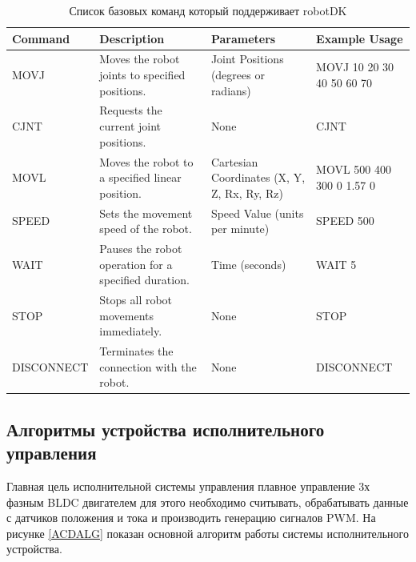 \begin{table}[H]
	\caption{Список базовых команд который поддерживает robotDK}\label{TRobotDK}
	\begin{adjustbox}{width=\textwidth}

		\begin{tabular}{|l|l|l|l|}
			\hline
			Command    & Description                                             & Parameters                                     & Example 			Usage             \\ \hline
			MOVJ       & Moves 			the robot joints to specified positions.       & Joint 			Positions (degrees or radians)        & MOVJ 			10 20 30 40 50 60 70 \\ \hline
			CJNT       & Requests 			the current joint positions.                & None                                           & CJNT                         \\ \hline
			MOVL       & Moves 			the robot to a specified linear position.      & Cartesian 			Coordinates (X, Y, Z, Rx, Ry, Rz) & MOVL 			500 400 300 0 1.57 0 \\ \hline
			SPEED      & Sets 			the movement speed of the robot.                & Speed 			Value (units per minute)              & SPEED 			500                 \\ \hline
			WAIT       & Pauses 			the robot operation for a specified duration. & Time 			(seconds)                              & WAIT 			5                    \\ \hline
			STOP       & Stops 			all robot movements immediately.               & None                                           & STOP                         \\ \hline
			DISCONNECT & Terminates 			the connection with the robot.            & None                                           & DISCONNECT                   \\ \hline
		\end{tabular}
	\end{adjustbox}

\end{table}

\subsection{Алгоритмы устройства исполнительного управления}

Главная цель исполнительной системы управления плавное управление 3х фазным BLDC двигателем для этого необходимо считывать, обрабатывать данные с датчиков положения и тока и производить генерацию сигналов PWM. На рисунке \ref{ACDALG} показан основной алгоритм работы системы исполнительного устройства.


